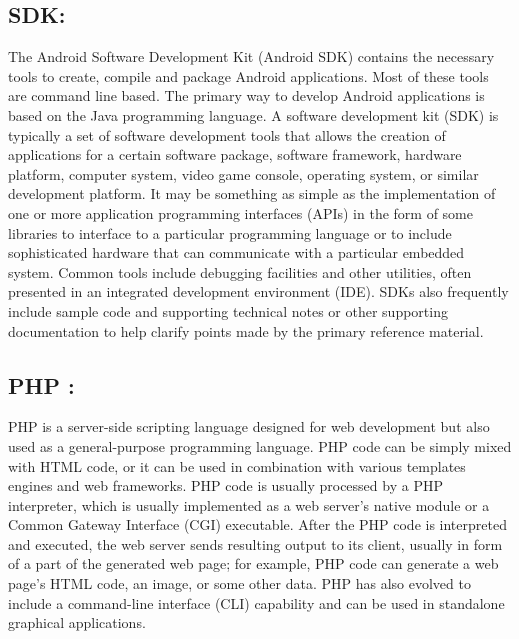\subsection{SDK: }
The Android Software Development Kit (Android SDK) contains the necessary tools to create, compile and package Android applications. Most of these tools are command line based. The primary way to develop Android applications is based on the Java programming language. A software development kit (SDK) is typically a set of software development tools that allows the creation of applications for a certain software package, software framework, hardware platform, computer system, video game console, operating system, or similar development platform. It may be something as simple as the implementation of one or more application programming interfaces (APIs) in the form of some libraries to interface to a particular programming language or to include sophisticated hardware that can communicate with a particular embedded system. Common tools include debugging facilities and other utilities, often presented in an integrated development environment (IDE). SDKs also frequently include sample code and supporting technical notes or other supporting documentation to help clarify points made by the primary reference material.
 
\subsection{PHP :}
 PHP is a server-side scripting language designed for web development but also used as a general-purpose programming language. PHP code can be simply mixed with HTML code, or it can be used in combination with various templates engines and web frameworks. PHP code is usually processed by a PHP interpreter, which is usually implemented as a web server's native module or a Common Gateway Interface (CGI) executable. After the PHP code is interpreted and executed, the web server sends resulting output to its client, usually in form of a part of the generated web page; for example, PHP code can generate a web page's HTML code, an image, or some other data. PHP has also evolved to include a command-line interface (CLI) capability and can be used in standalone graphical applications.

